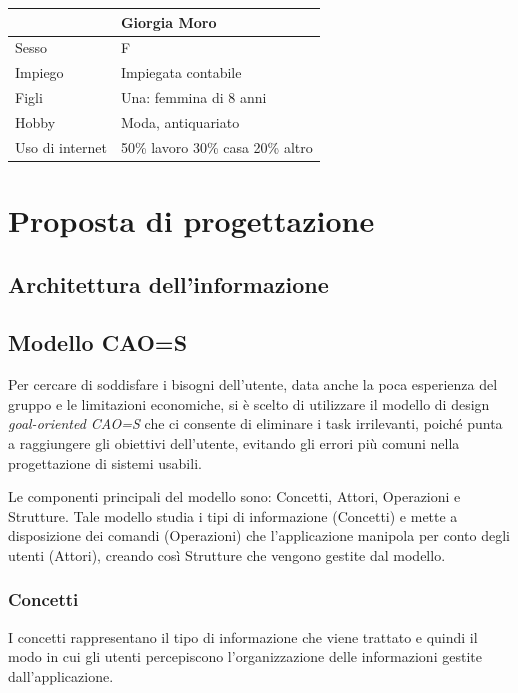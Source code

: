 \documentclass[12pt,italian,]{report}
\begin{document}
\begin{longtable}[]{@{}ll@{}}
\toprule
& Giorgia Moro\tabularnewline
\midrule
\endhead
Sesso & F\tabularnewline
Impiego & Impiegata contabile\tabularnewline
Figli & Una: femmina di 8 anni\tabularnewline
Hobby & Moda, antiquariato\tabularnewline
Uso di internet & 50\% lavoro 30\% casa 20\% altro\tabularnewline
\bottomrule
\end{longtable}

\hypertarget{proposta-di-progettazione}{%
\chapter{Proposta di progettazione}\label{proposta-di-progettazione}}

\hypertarget{architettura-dellinformazione}{%
\section{Architettura
dell'informazione}\label{architettura-dellinformazione}}

\hypertarget{modello-caos}{%
\section{Modello CAO=S}\label{modello-caos}}

Per cercare di soddisfare i bisogni dell'utente, data anche la poca
esperienza del gruppo e le limitazioni economiche, si è scelto di
utilizzare il modello di design \emph{goal-oriented CAO=S} che ci
consente di eliminare i task irrilevanti, poiché punta a raggiungere gli
obiettivi dell'utente, evitando gli errori più comuni nella
progettazione di sistemi usabili.

Le componenti principali del modello sono: Concetti, Attori,
Operazioni e Strutture. Tale modello studia i tipi di informazione
(Concetti) e mette a disposizione dei comandi (Operazioni) che
l'applicazione manipola per conto degli utenti (Attori), creando così
Strutture che vengono gestite dal modello.

\hypertarget{concetti}{%
\subsection{Concetti}\label{concetti}}

I concetti rappresentano il tipo di informazione che viene trattato e
quindi il modo in cui gli utenti percepiscono l'organizzazione delle
informazioni gestite dall'applicazione.
\end{document}

